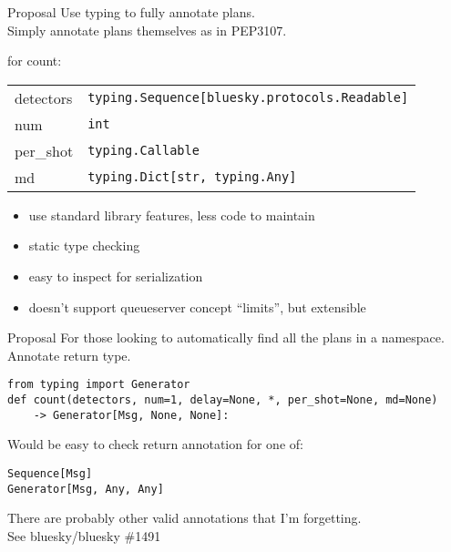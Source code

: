 \documentclass{presentation}
\begin{document}
\begin{frame}{Proposal}
  Use typing to fully annotate plans. \\
  Simply annotate plans themselves as in PEP3107. \\

  \vfill

  for count:
  \begin{tabular}{ l | l }
    detectors & \texttt{typing.Sequence[bluesky.protocols.Readable]} \\
    num & \texttt{int} \\
    per\_shot & \texttt{typing.Callable} \\
    md & \texttt{typing.Dict[str, typing.Any]} \\
  \end{tabular}

  \vfill

  \begin{itemize}
    \item use standard library features, less code to maintain
    \item static type checking
    \item easy to inspect for serialization
    \item doesn't support queueserver concept ``limits'', but extensible
  \end{itemize}
\end{frame}

\begin{frame}[fragile]{Proposal}
  For those looking to automatically find all the plans in a namespace. \\
  Annotate return type.

  \vfill

  \scriptsize
  \begin{verbatim}
from typing import Generator
def count(detectors, num=1, delay=None, *, per_shot=None, md=None)
    -> Generator[Msg, None, None]:
  \end{verbatim}

  \vfill

  \normalsize
  Would be easy to check return annotation for one of:

  \vfill

  \scriptsize
  \begin{verbatim}
Sequence[Msg]
Generator[Msg, Any, Any]
  \end{verbatim}

  \vfill

  \normalsize
  There are probably other valid annotations that I'm forgetting. \\
  See bluesky/bluesky \#1491
\end{frame}
\end{document}
